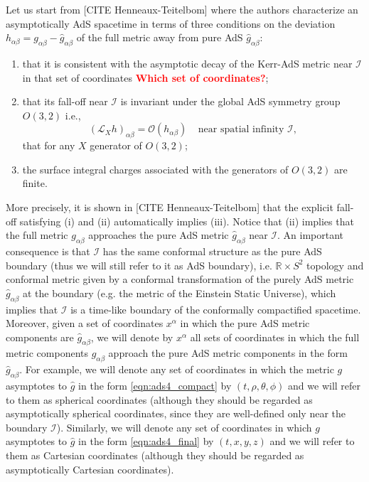 \documentclass[a4paper,11pt]{article}
\numberwithin{equation}{section}
\begin{document}
Let us start from [CITE Henneaux-Teitelbom] where the authors characterize an asymptotically AdS spacetime in terms of three conditions on the deviation $h_{\alpha\beta}=g_{\alpha\beta}-\hat{g}_{\alpha\beta}$ of the full metric away from pure AdS $\hat{g}_{\alpha\beta}$:
\begin{enumerate}
\item that it is consistent with the asymptotic decay of the Kerr-AdS metric near $\mathcal{I}$ in that set of coordinates \textcolor{red}{\bf Which set of coordinates?};
\item that its fall-off near $\mathcal{I}$ is invariant under the global AdS symmetry group $O(3,2)$ i.e.,
\begin{equation}\label{eqn:asyKilleq}
(\mathcal{L}_X h)_{\alpha\beta}=\mathcal{O}(h_{\alpha\beta})\;\;\;\; \textrm{near spatial infinity $\mathcal{I}$},
\end{equation}
that for any $X$ generator of $O(3,2)$;
\item the surface integral charges associated with the generators of $O(3,2)$ are finite.
\end{enumerate}
More precisely, it is shown in [CITE Henneaux-Teitelbom] that the explicit fall-off satisfying (i) and (ii) automatically implies (iii).
Notice that (ii) implies that the full metric $g_{\alpha\beta}$ approaches the pure AdS metric $\hat{g}_{\alpha\beta}$ near $\mathcal{I}$. An important consequence is that $\mathcal{I}$ has the same conformal structure as the pure AdS boundary (thus we will still refer to it as AdS boundary), i.e. $\mathbb{R}\times S^2$ topology and conformal metric given by a conformal transformation of the purely AdS metric $\hat{g}_{\alpha\beta}$ at the boundary (e.g. the metric of the Einstein Static Universe), which implies that $\mathcal{I}$ is a time-like boundary of the conformally compactified spacetime. Moreover, given a set of coordinates $x^\alpha$ in which the pure AdS metric components are $\hat{g}_{\alpha\beta}$, we will denote by $x^\alpha$ all sets of coordinates in which the full metric components $g_{\alpha\beta}$ approach the pure AdS metric components in the form $\hat{g}_{\alpha\beta}$. For example, we will denote any set of coordinates in which the metric $g$ asymptotes to $\hat{g}$ in the form \eqref{eqn:ads4_compact} by $(t,\rho,\theta,\phi)$ and we will refer to them as spherical coordinates (although they should be regarded as asymptotically spherical coordinates, since they are well-defined only near the boundary $\mathcal{I}$). Similarly, we will denote any set of coordinates in which $g$ asymptotes to $\hat{g}$ in the form \eqref{eqn:ads4_final} by $(t,x,y,z)$ and we will refer to them as Cartesian coordinates (although they should be regarded as asymptotically Cartesian coordinates).
\end{document}
